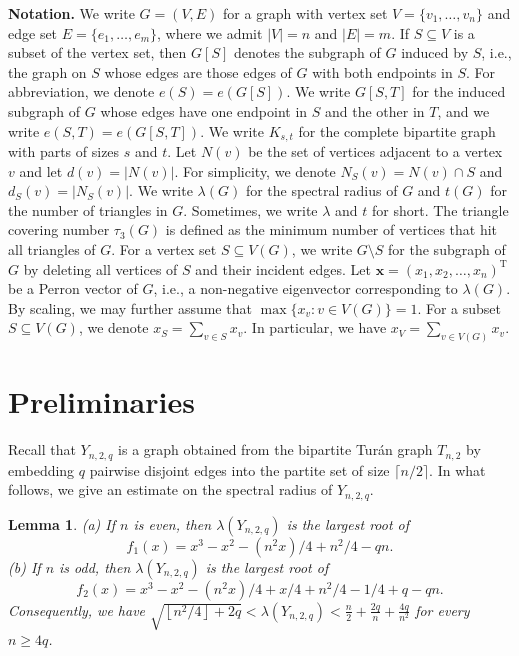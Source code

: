 \documentclass[11pt]{article}
\newtheorem{lemma}[theorem]{Lemma}
\begin{document}
\medskip
\noindent 
{\bf Notation.}  
We write $G=(V,E)$ for a graph with vertex set 
$V=\{v_1,\ldots ,v_n\}$ and edge set $E=\{e_1,\ldots ,e_m\}$, where we admit $|V|=n$ and $|E|=m$. 
If $S\subseteq V$ is a subset of the vertex set, then 
$G[S]$ denotes the subgraph of $G$ induced by $S$, 
i.e., the graph on $S$ whose edges are those edges of $G$ 
with both endpoints in $S$. 
For abbreviation, we denote $e(S)=e(G[S])$.  
We write $G[S,T]$ for the induced 
subgraph of $G$
whose edges have one endpoint in $S$ and the other in $T$,  and we write $e(S,T)=e(G[S,T])$.  
We write $K_{s,t}$ 
for the complete bipartite graph with parts of sizes $s$ 
and $t$. 
Let $N(v)$ be the set of vertices adjacent to a vertex $v$ and 
let $d(v)=|N(v)|$. 
For simplicity, we denote $N_S(v)= N(v) \cap S$ 
and $d_S(v)=|N_S(v)|$. 
 We write $\lambda (G)$ for the spectral radius of $G$ 
 and $t(G)$ for the number of triangles in $G$.  
 Sometimes, we write $\lambda$ and $t$ for short. 
 The triangle covering number $\tau_3(G)$ is defined as the minimum number of vertices 
that hit all triangles of $G$. 
For a vertex set $S\subseteq V(G)$, 
we write $G\setminus S $ for the subgraph of $G$ 
by deleting all vertices of $S$ and their incident edges. 
Let $\bm{x}=(x_1,x_2,\ldots ,x_n)^{\mathrm{T}}$ be a Perron vector of $G$, 
i.e., a non-negative eigenvector corresponding to $\lambda (G)$. 
By scaling, we may further assume that $\max\{x_v: v\in V(G)\}=1$. 
For a subset $S\subseteq V(G)$, we denote $x_S=\sum_{v\in S}x_v$. 
In particular, we have $x_V= \sum_{v\in V(G)} x_v$. 


\section{Preliminaries}

\label{sec3}


Recall that $Y_{n,2,q}$ is a graph obtained from the bipartite Tur\'{a}n graph  $T_{n,2}$ by embedding  $q$ pairwise disjoint edges into the partite set of size $\lceil n/2\rceil$. In what follows, we give an estimate on the spectral radius of $Y_{n,2,q}$. 

\begin{lemma} \label{lem-LLP}
(a) If $n$ is even, then $\lambda(Y_{n,2,q})$
is the largest root of
\[  f_1(x)=x^3-x^2 - (n^2x)/4 + n^2/4 - q n. \]
(b) If $n$ is odd, then $\lambda(Y_{n,2,q})$
is the largest root of
\[ f_2(x)=x^3 - x^2 - (n^2x)/4 + x/4 + n^2/4 -1/4 + q - q n. \]
Consequently, we have $ \sqrt{\left\lfloor {n^2}/{4} \right\rfloor +2q} < \lambda (Y_{n,2,q}) < \frac{n}{2} + \frac{2q}{n} + \frac{4q}{n^2}$ for every $n\ge 4q$. 
\end{lemma}
\end{document}
